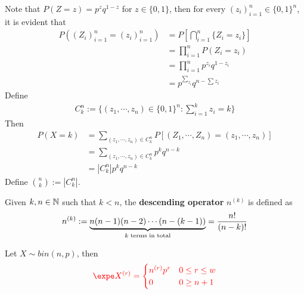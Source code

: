 \documentclass{article}
\begin{document}
   	\begin{theorem}
   		Note that $P(Z=z) = p^z q^{1-z}$ for $z \in \{0, 1\}$, then for every $(z_i)_{i=1}^n \in \{0, 1\}^n$, it is evident that
   		\begin{align}
   			P((Z_i)_{i=1}^n = (z_i)_{i=1}^n) &= P \left[\bigcap_{i=1}^n\{Z_i = z_i\}\right] \\
   			&= \prod_{i=1}^n P(Z_i = z_i) \\
   			&= \prod_{i=1}^n p^{z_i} q^{1-z_i} \\
   			&= p^{\sum_{z_i}} q^{n - \sum z_i}
   		\end{align}
   		Define
   		\begin{align}
   			C_k^n := \{(z_1, \cdots, z_n) \in \{0, 1\}^n: \sum_{i=1}^k z_i = k\}
   		\end{align}
   		Then 
   		\begin{align}
   			P(X = k) &= \sum_{(z_1, \cdots, z_n) \in C_k^n} P[(Z_1, \cdots, Z_n) = (z_1, \cdots, z_n)] \\
   			&= \sum_{(z_1, \cdots, z_n) \in C_k^n} p^k q^{n-k} \\
   			&= |C_k^n| p^k q^{n-k}
   		\end{align}
   		Define $\binom{n}{k} := |C_k^n|$.
   	\end{theorem}
   	
   	\begin{definition}
   		Given $k, n \in \mathbb{N}$ such that $k < n$, the \textbf{descending operator} $n^{(k)}$ is defined as
   		\begin{align}
   			n^{(k)} := \underbrace{n (n-1) (n-2) \cdots (n-(k-1))}_{k\text{{ terms in total}}} = \frac{n!}{(n-k)!}
   		\end{align}
   	\end{definition}
   	
   	\begin{theorem}
   		Let $X \sim bin(n, p)$, then
   		\begin{align}
   			\red{\expe X^{(r)} = \begin{cases}
   				n^{(r)} p^r &0 \leq r \leq w \\
   				0 &0\geq n+1
   			\end{cases}}
   		\end{align}
   	\end{theorem}
   	
\end{document}
